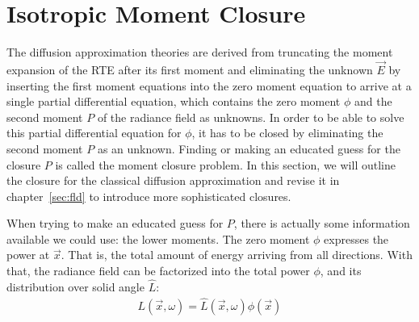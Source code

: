 \section{Isotropic Moment Closure}
\label{sec:moment_closure}

The diffusion approximation theories are derived from truncating the moment expansion of the RTE after its first moment and eliminating the unknown $\vec{E}$ by inserting the first moment equations into the zero moment equation to arrive at a single partial differential equation, which contains the zero moment $\phi$ and the second moment $P$ of the radiance field as unknowns. In order to be able to solve this partial differential equation for $\phi$, it has to be closed by eliminating the second moment $P$ as an unknown. Finding or making an educated guess for the closure $P$ is called the moment closure problem. In this section, we will outline the closure for the classical diffusion approximation and revise it in chapter~\ref{sec:fld} to introduce more sophisticated closures.

When trying to make an educated guess for $P$, there is actually some information available we could use: the lower moments. The zero moment $\phi$ expresses the power at $\vec{x}$. That is, the total amount of energy arriving from all directions. With that, the radiance field can be factorized into the total power $\phi$, and its distribution over solid angle $\hat{L}$:
\begin{align*}
L(\vec{x}, \omega) = \hat{L}(\vec{x}, \omega)\phi(\vec{x})
\end{align*}

